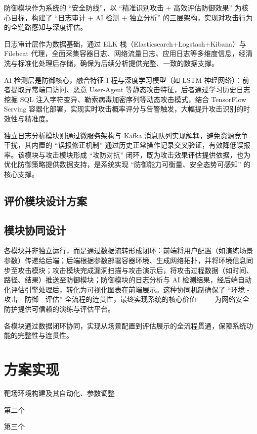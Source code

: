 \documentclass[lang=cn,10pt]{elegantbook}
\begin{document}
\begin{proposition}
    防御模块作为系统的 “安全防线”，以 “精准识别攻击 + 高效评估防御效果” 为核心目标，构建了 “日志审计 + AI 检测 + 独立分析” 的三层架构，实现对攻击行为的全链路感知与深度评估。​
    
日志审计层作为数据基础，通过 ELK 栈（Elasticsearch+Logstash+Kibana）与 Filebeat 代理，全面采集容器日志、网络流量日志、应用日志等多维度信息，经清洗与标准化处理后存储，确保为后续分析提供完整、一致的数据支撑。​

AI 检测层是防御核心，融合特征工程与深度学习模型（如 LSTM 神经网络）：前者提取异常端口访问、恶意 User-Agent 等静态攻击特征，后者通过学习历史日志挖掘 SQL 注入字符变异、勒索病毒加密序列等动态攻击模式，结合 TensorFlow Serving 容器化部署，实现实时攻击概率评分与告警触发，大幅提升攻击识别的时效性与精准度。​

独立日志分析模块则通过微服务架构与 Kafka 消息队列实现解耦，避免资源竞争干扰，其内置的 “误报修正机制” 通过历史正常操作记录交叉验证，有效降低误报率。该模块与攻击模块形成 “攻防对抗” 闭环，既为攻击效果评估提供依据，也为优化防御策略提供数据支持，是系统实现 “防御能力可衡量、安全态势可感知” 的核心支撑。
\end{proposition}

\section{评价模块设计方案}


\section{模块协同设计}
各模块并非独立运行，而是通过数据流转形成闭环：前端将用户配置（如演练场景参数）传递给后端；后端根据参数部署容器环境、生成网络拓扑，并将环境信息同步至攻击模块；攻击模块完成漏洞扫描与攻击演示后，将攻击过程数据（如时间、路径、结果）推送至防御模块；防御模块的日志分析与 AI 检测结果，经后端自动化评估引擎处理后，转化为可视化图表在前端展示。这种协同机制确保了 “环境 - 攻击 - 防御 - 评估” 全流程的连贯性，最终实现系统的核心价值 —— 为网络安全防护提供可信赖的演练与评估平台。
\begin{definition}
    各模块通过数据闭环协同，实现从场景配置到评估展示的全流程贯通，保障系统功能的完整性与连贯性。
\end{definition}

\chapter{方案实现}
\begin{introduction}
  \item 靶场环境构建及其自动化、参数调整
  \item 第二个
  \item 第三个
\end{introduction}
\end{document}
